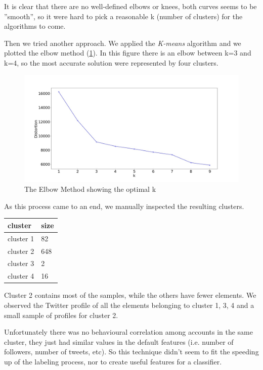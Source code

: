 \newpage
It is clear that there are no well-defined elbows or knees, both curves seems to be ''smooth'', so it were hard to pick a reasonable k (number of clusters) for the algorithms to come.

Then we tried another approach. We applied the \emph{K-means} algorithm and we plotted the elbow method (\ref{fig:elbow}). In this figure there is an elbow between k=3 and k=4, so the most accurate solution were represented by four clusters.

\begin{figure}
	\includegraphics[width=\linewidth]{chapter3/figure/elbow.jpg}
	\caption{The Elbow Method showing the optimal k}
	\label{fig:elbow}
\end{figure}


As this process came to an end, we manually inspected the resulting clusters.

\begin{center}
	\begin{tabular}{ll}
	\\cluster&size\\
	\hline\hline
	cluster 1&82\\
	cluster 2&648\\
	cluster 3&2\\
	cluster 4&16\\\hline
	\end{tabular}
\end{center}

Cluster 2 contains most of the samples, while the others have fewer elements.
We observed the Twitter profile of all the elements belonging to cluster 1, 3, 4 and a small sample of profiles for cluster 2.

Unfortunately there was no behavioural correlation among accounts in the same cluster, they just had similar values in the default features (i.e. number of followers, number of tweets, etc). So this technique didn't seem to fit the speeding up of the labeling process, nor to create useful features for a classifier.

